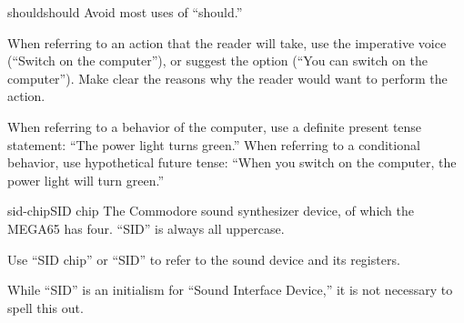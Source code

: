 \begin{sgentry}{should}{should}
    Avoid most uses of ``should.''

    When referring to an action that the reader will take, use the imperative voice (``Switch on the computer''), or suggest the option (``You can switch on the computer''). Make clear the reasons why the reader would want to perform the action.

    When referring to a behavior of the computer, use a definite present tense statement: ``The power light turns green.'' When referring to a conditional behavior, use hypothetical future tense: ``When you switch on the computer, the power light will turn green.''
\end{sgentry}

\begin{sgentry}{sid-chip}{SID chip}
    The Commodore sound synthesizer device, of which the MEGA65 has four. ``SID'' is always all uppercase.

    Use ``SID chip'' or ``SID'' to refer to the sound device and its registers.

    While ``SID'' is an initialism for ``Sound Interface Device,'' it is not necessary to spell this out.
\end{sgentry}

